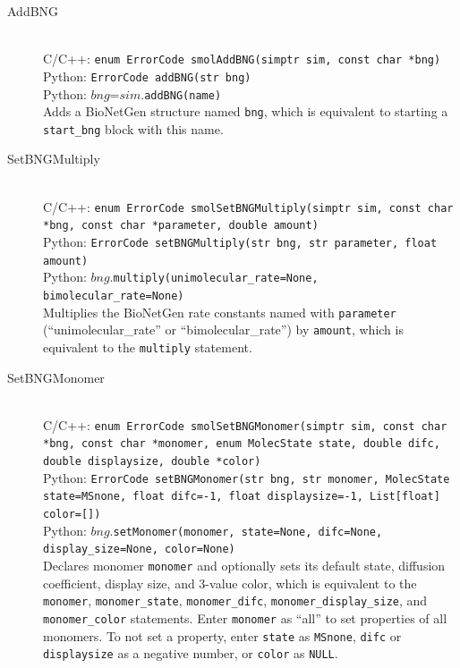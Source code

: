\documentclass {scrbook}
\newcommand {\ttt} {\texttt}
\begin{document}
\begin{description}

\item[AddBNG]
\hfill \\
C/C++: \ttt{enum ErrorCode smolAddBNG(simptr sim, const char *bng)}\\
Python: \ttt{ErrorCode addBNG(str bng)}\\
Python: $bng$=$sim$.\ttt{addBNG(name)}\\
Adds a BioNetGen structure named \ttt{bng}, which is equivalent to starting a \ttt{start\_bng} block with this name.

\item[SetBNGMultiply]
\hfill \\
C/C++: \ttt{enum ErrorCode smolSetBNGMultiply(simptr sim, const char *bng, const char *parameter, double amount)}\\
Python: \ttt{ErrorCode setBNGMultiply(str bng, str parameter, float amount)}\\
Python: $bng$.\ttt{multiply(unimolecular\_rate=None, bimolecular\_rate=None)}\\
Multiplies the BioNetGen rate constants named with \ttt{parameter} (``unimolecular\_rate'' or ``bimolecular\_rate'') by \ttt{amount}, which is equivalent to the \ttt{multiply} statement.

\item[SetBNGMonomer]
\hfill \\
C/C++: \ttt{enum ErrorCode smolSetBNGMonomer(simptr sim, const char *bng, const char *monomer, enum MolecState state, double difc, double displaysize, double *color)}\\
Python: \ttt{ErrorCode setBNGMonomer(str bng, str monomer, MolecState state=MSnone, float difc=-1, float displaysize=-1, List[float] color=[])}\\
Python: $bng$.\ttt{setMonomer(monomer, state=None, difc=None, display\_size=None, color=None)}\\
Declares monomer \ttt{monomer} and optionally sets its default state, diffusion coefficient, display size, and 3-value color, which is equivalent to the \ttt{monomer}, \ttt{monomer\_state}, \ttt{monomer\_difc}, \ttt{monomer\_display\_size}, and \ttt{monomer\_color} statements. Enter \ttt{monomer} as ``all'' to set properties of all monomers. To not set a property, enter \ttt{state} as \ttt{MSnone}, \ttt{difc} or \ttt{displaysize} as a negative number, or \ttt{color} as \ttt{NULL}.


\end{description}
\end{document}
